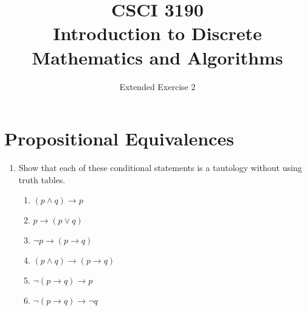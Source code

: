 \documentclass{sig-alternate-05-2015}
\begin{document}






%

\title{CSCI 3190 \\ Introduction to Discrete Mathematics and Algorithms}
\subtitle{Extended Exercise 2}

\maketitle
\begin{abstract}

\end{abstract}

\keywords{}

\section{Propositional Equivalences}
\begin{enumerate}
\item Show that each of these conditional statements is a tautology without using truth tables.
\begin{enumerate}
	\item $(p \wedge q) \rightarrow p$
	\item $p \rightarrow (p \vee q)$
	\item $\neg p \rightarrow (p \rightarrow q)$
	\item $(p \wedge q) \rightarrow (p \rightarrow q)$
	\item $\neg (p \rightarrow q) \rightarrow p$
	\item $\neg(p \rightarrow q) \rightarrow \neg q$
\end{enumerate}
\end{enumerate}
\end{document}
